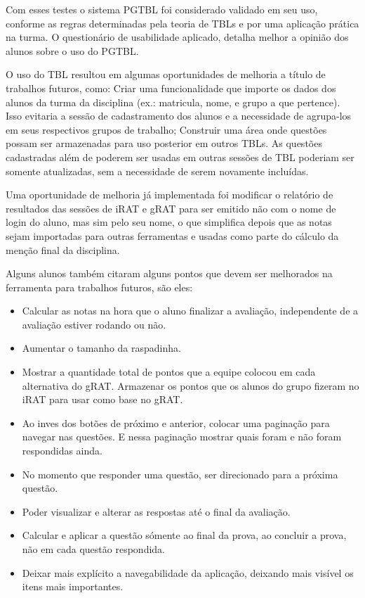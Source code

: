 \begin{quoting}[rightmargin=0cm, leftmargin=4cm]
  \noindent
  Com esses testes o sistema PGTBL foi considerado validado em seu uso, conforme as regras determinadas pela teoria de
  TBLs e por uma aplicação prática na turma. O questionário de usabilidade aplicado, detalha melhor a opinião dos alunos
  sobre o uso do PGTBL.

  \noindent
  O uso do TBL resultou em algumas oportunidades de melhoria a título de trabalhos futuros, como: Criar uma
  funcionalidade que importe os dados dos alunos da turma da disciplina (ex.: matricula,  nome, e grupo a que pertence).
  Isso evitaria a sessão de cadastramento dos alunos e a necessidade de agrupa-los em seus respectivos grupos de
  trabalho; Construir uma área onde questões possam ser armazenadas para uso posterior em outros TBLs. As questões
  cadastradas além de poderem ser usadas em outras sessões de TBL poderiam ser somente atualizadas, sem a necessidade
  de serem novamente incluídas.

  \noindent
  Uma oportunidade de melhoria já implementada foi modificar o relatório de resultados das sessões de iRAT e gRAT para
  ser emitido não com o nome de login do aluno, mas sim pelo seu nome, o que simplifica depois que as notas sejam
  importadas para outras ferramentas e usadas como parte do cálculo da menção final da disciplina. \cite{ajax}
\end{quoting}

Alguns alunos também citaram alguns pontos que devem ser melhorados na ferramenta para trabalhos futuros, são eles:

\begin{itemize}
  \item Calcular as notas na hora que o aluno finalizar a avaliação, independente de a avaliação estiver rodando ou não.
  \item Aumentar o tamanho da raspadinha.
  \item Mostrar a quantidade total de pontos que a equipe colocou em cada alternativa do gRAT. Armazenar os pontos que
    os alunos do grupo fizeram no iRAT para usar como base no gRAT.
  \item Ao inves dos botões de próximo e anterior, colocar uma paginação para navegar nas questões. E nessa paginação
    mostrar quais foram e não foram respondidas ainda.
  \item No momento que responder uma questão, ser direcionado para a próxima questão.
  \item Poder visualizar e alterar as respostas até o final da avaliação.
  \item Calcular e aplicar a questão sómente ao final da prova, ao concluir a prova, não em cada questão respondida.
  \item Deixar mais explícito a navegabilidade da aplicação, deixando mais visível os itens mais importantes.
\end{itemize}
